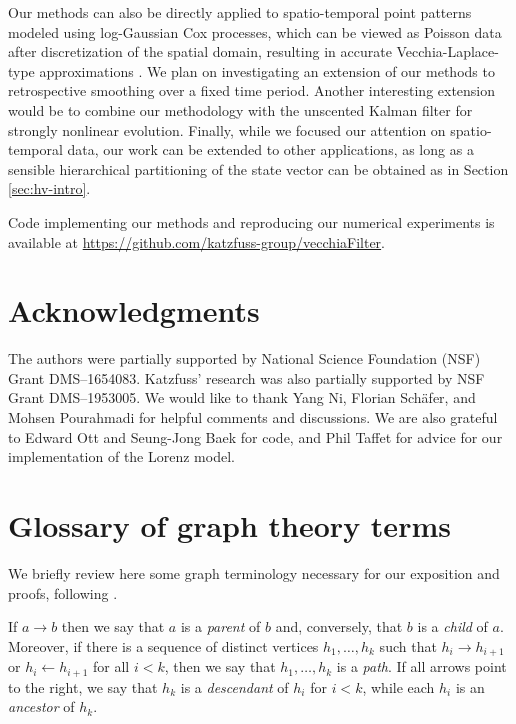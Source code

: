 \documentclass[12pt,letterpaper]{article}
\theoremstyle{propstyle}
\theoremstyle{propstyle}
\theoremstyle{propstyle}
\theoremstyle{propstyle}
\theoremstyle{propstyle}
\begin{document}
Our methods can also be directly applied to spatio-temporal point patterns modeled using log-Gaussian Cox processes, which can be viewed as Poisson data after discretization of the spatial domain, resulting in accurate Vecchia-Laplace-type approximations \citep{Zilber2019}.
We plan on investigating an extension of our methods to retrospective smoothing over a fixed time period. Another interesting extension would be to combine our methodology with the unscented Kalman filter \citep[][]{Julier1997} for strongly nonlinear evolution.
Finally, while we focused our attention on spatio-temporal data, our work can be extended to other applications, as long as a sensible hierarchical partitioning of the state vector can be obtained as in Section \ref{sec:hv-intro}.

Code implementing our methods and reproducing our numerical experiments is available at \url{https://github.com/katzfuss-group/vecchiaFilter}.


\FloatBarrier
\footnotesize
\appendix
\section*{Acknowledgments}

The authors were partially supported by National Science Foundation (NSF) Grant DMS--1654083. Katzfuss' research was also partially supported by NSF Grant DMS--1953005. We would like to thank Yang Ni, Florian Sch\"afer, and Mohsen Pourahmadi for helpful comments and discussions. We are also grateful to Edward Ott and Seung-Jong Baek for code, and Phil Taffet for advice for our implementation of the Lorenz model.




\section{Glossary of graph theory terms\label{app:graph}}

We briefly review here some graph terminology necessary for our exposition and proofs, following \citet{lauritzen1996graphical}.

If $a \rightarrow b$ then we say that $a$ is a \emph{parent} of $b$ and, conversely, that $b$ is a \emph{child} of $a$. Moreover, if there is a sequence of distinct vertices $h_1, \dots, h_k$ such that $h_i \rightarrow h_{i+1}$ or $h_i \leftarrow h_{i+1}$ for all $i<k$, then we say that $h_1, \dots, h_k$ is a \emph{path}. If all arrows point to the right, we say that $h_k$ is a \emph{descendant} of $h_i$ for $i<k$, while each $h_i$ is an \emph{ancestor} of $h_k$.
\end{document}
